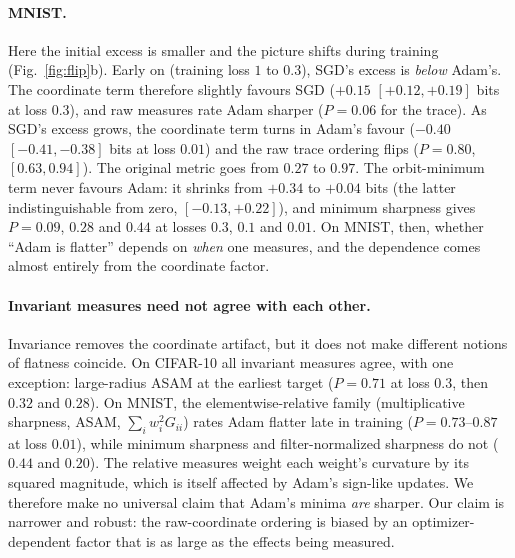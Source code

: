 \documentclass[10pt]{article}
\theoremstyle{remark}
\begin{document}
\paragraph{MNIST.} Here the initial excess is smaller and the picture shifts during training (Fig.~\ref{fig:flip}b). Early on (training loss $1$ to $0.3$), SGD's excess is \emph{below} Adam's. The coordinate term therefore slightly favours SGD ($+0.15$ $[+0.12,+0.19]$ bits at loss $0.3$), and raw measures rate Adam sharper ($P=0.06$ for the trace). As SGD's excess grows, the coordinate term turns in Adam's favour ($-0.40$ $[-0.41,-0.38]$ bits at loss $0.01$) and the raw trace ordering flips ($P=0.80$, $[0.63,0.94]$). The original metric goes from $0.27$ to $0.97$. The orbit-minimum term never favours Adam: it shrinks from $+0.34$ to $+0.04$ bits (the latter indistinguishable from zero, $[-0.13,+0.22]$), and minimum sharpness gives $P=0.09$, $0.28$ and $0.44$ at losses $0.3$, $0.1$ and $0.01$. On MNIST, then, whether ``Adam is flatter'' depends on \emph{when} one measures, and the dependence comes almost entirely from the coordinate factor.

\paragraph{Invariant measures need not agree with each other.} Invariance removes the coordinate artifact, but it does not make different notions of flatness coincide. On CIFAR-10 all invariant measures agree, with one exception: large-radius ASAM at the earliest target ($P=0.71$ at loss $0.3$, then $0.32$ and $0.28$). On MNIST, the elementwise-relative family (multiplicative sharpness, ASAM, $\sum_iw_i^2G_{ii}$) rates Adam flatter late in training ($P=0.73$--$0.87$ at loss $0.01$), while minimum sharpness and filter-normalized sharpness do not ($0.44$ and $0.20$). The relative measures weight each weight's curvature by its squared magnitude, which is itself affected by Adam's sign-like updates. We therefore make no universal claim that Adam's minima \emph{are} sharper. Our claim is narrower and robust: the raw-coordinate ordering is biased by an optimizer-dependent factor that is as large as the effects being measured.
\end{document}
